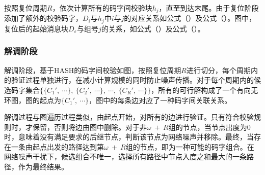 按照复位周期$R$，依次计算所有的码字间校验块$h_{j}$，直至到达末尾。由于复位阶段添加了额外的校验码字，$D_{i}$与$h_{j}$中$i$与$j$的对应关系如公式（）及公式（）。图中，复位后的起始消息块$D_{\varepsilon}$与组号$j$的关系，如公式（）及公式（）。

\subsubsection{解调阶段}
\label{chap:hash:robustness:hash:demodulation}


解调阶段，基于HASH的码字间校验如图，按照复位周期$R$进行切分，每个周期内的验证过程单独进行，在减小计算规模的同时防止噪声传播。对于每个周期内的候选码字集合$\{\{C_{1}',\ \cdots\},\ \{C_{2}',\ \cdots \},\ \cdots ,\ \{C_{R}',\ \cdots\}\}$，所有的可行解构成了一个有向无环图，图的起点为$\{C_{1}',\ \cdots \}$，图中的每条边对应了一种码字间关联关系。

解调过程与图遍历过程类似，由起点开始，对所有的边进行验证。只有符合校验规则时，才保留，否则将边由图中删除。对于非$\omega\ +\ R$组的节点，当节点出度为0时，意味着没有满足要求的后继节点，判断该节点为网络噪声并移除。最终，当存在一条由起点出发的路径达到第$\omega\ +\ R$组的节点，即为一种可能的码字组合。在网络噪声干扰下，候选组合不唯一，选择所有路径中节点入度之和最大的一条路径，作为最终结果。

